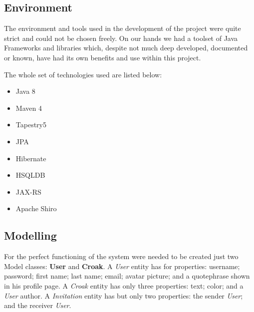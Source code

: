 \documentclass[paper=a4, fontsize=12pt]{scrartcl}
\numberwithin{equation}{section}    %
\numberwithin{figure}{section}      %
\numberwithin{table}{section}        %
\begin{document}
\subsection{Environment}
The environment and tools used in the development of the project were quite strict
and could not be chosen freely. On our hands we had a toolset of Java Frameworks and libraries
which, despite not much deep developed, documented or known, have had its own benefits
and use within this project.

The whole set of technologies used are listed below:

\begin{itemize}
  \item Java 8
  \item Maven 4
  \item Tapestry5
  \item JPA
  \item Hibernate
  \item HSQLDB
  \item JAX-RS
  \item Apache Shiro
\end{itemize}

\subsection{Modelling}
For the perfect functioning of the system were needed to be created just two Model classes: \textbf{User} and \textbf{Croak}.
A \emph{User} entity has for properties: username; password; first name; last name; email; avatar picture;
and a quotephrase shown in his profile page.
A \emph{Croak} entity has only three properties: text; color; and a \emph{User} author.
A \emph{Invitation} entity has but only two properties: the sender \emph{User}; and the receiver \emph{User}.
\end{document}
